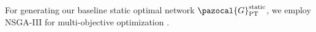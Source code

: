 \documentclass[a4paper,fleqn]{cas-sc}
\begin{document}
For generating our baseline static optimal network $\pazocal{G}_{\text{PT}}^{\text{static}}$, we employ NSGA-III for multi-objective optimization
. 
%
\end{document}
